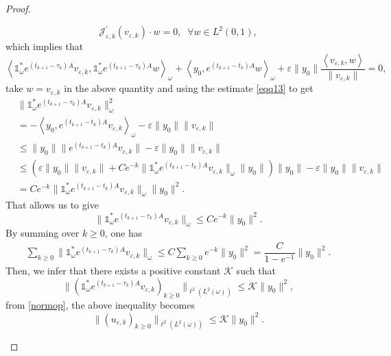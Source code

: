 \documentclass[10pt,a4paper]{amsart}
\begin{document}
\begin{proof}
\begin{enumerate}
    \[\mathcal{J}^{'}_{\varepsilon,k} (v_{\varepsilon,k}) \cdot w =0, \;\;\forall w \in L^2(0,1),\]
    which implies that
    \[\left\langle \mathds{1}^{*}_{\omega} e^{(t_{k+1}-\tau_k)A} v_{\varepsilon,k}, \mathds{1}^{*}_{\omega} e^{(t_{k+1}-\tau_k)A} w \right\rangle_{\omega} + \left\langle y_0 , e^{(t_{k+1}-t_k)A} w \right\rangle_{\omega} + \varepsilon \|y_0\|\dfrac{\left\langle v_{\varepsilon,k} , w \right\rangle}{\| v_{\varepsilon,k} \|} =0,\]
    take $w=v_{\varepsilon,k}$ in the above quantity and using the estimate \eqref{eqq13} to get
    \begin{align}\label{eqq9}
       & \| \mathds{1}^{*}_{\omega} e^{(t_{k+1}-\tau_k)A} v_{\varepsilon,k} \|_{\omega}^2\nonumber\\
        &= - \left\langle y_0 , e^{(t_{k+1}-t_k)A} v_{\varepsilon,k} \right\rangle_{\omega} - \varepsilon \|y_0\| \| v_{\varepsilon,k} \|\nonumber\\
        &\leq \| y_0 \| \| e^{(t_{k+1}-t_k)A} v_{\varepsilon,k} \| - \varepsilon \|y_0\| \| v_{\varepsilon,k} \|\nonumber\\
        &\leq \left( \varepsilon \|y_0\| \| v_{\varepsilon,k} \| + C e^{-k} \| \mathds{1}^{*}_{\omega} e^{(t_{k+1}-t_k)A} v_{\varepsilon,k} \|_{\omega} \| y_0 \| \right) \| y_0\| - \varepsilon \|y_0\|\| v_{\varepsilon,k} \|\nonumber\\
        &=C e^{-k} \| \mathds{1}^{*}_{\omega} e^{(t_{k+1}-t_k)A} v_{\varepsilon,k} \|_{\omega} \| y_0 \|^2.
    \end{align}
    That allows us to give
    \[\| \mathds{1}^{*}_{\omega} e^{(t_{k+1}-\tau_k)A} v_{\varepsilon,k} \|_{\omega} \leq C e^{-k} \| y_0 \|^2.\]
    By summing over $k \geq 0$, one has
    \begin{align*}
        \sum_{k \geq 0} \| \mathds{1}^{*}_{\omega} e^{(t_{k+1}-\tau_k)A} v_{\varepsilon,k} \|_{\omega} 
        \leq C \sum_{k \geq 0} e^{-k} \| y_0 \|^2
        =\dfrac{C}{1-e^{-1}} \| y_0\|^2.
    \end{align*}
   Then, we infer that there exists a positive constant $\mathcal{K}$ such that
   \begin{equation*}
       \| (\mathds{1}^{*}_{\omega} e^{(t_{k+1}-\tau_k)A} v_{\varepsilon,k})_{k \geq 0} \|_{\ell^2(L^2(\omega))} \leq \mathcal{K} \| y_0\|^2, 
   \end{equation*}
   from \eqref{normop}, the above inequality becomes
   \begin{equation}\label{eqq10}
       \| ( u_{\varepsilon,k})_{k \geq 0} \|_{\ell^2(L^2(\omega))} \leq \mathcal{K} \| y_0\|^2.

\end{equation}
\end{enumerate}
\end{proof}
\end{document}
